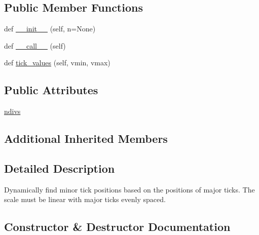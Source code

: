 \subsection*{Public Member Functions}
\begin{DoxyCompactItemize}
\item 
def \hyperlink{classmatplotlib_1_1ticker_1_1AutoMinorLocator_aa4a7d68d7cd0c7fa8e579b0b408b34d3}{\+\_\+\+\_\+init\+\_\+\+\_\+} (self, n=None)
\item 
def \hyperlink{classmatplotlib_1_1ticker_1_1AutoMinorLocator_aada705290a86fa27af2012611312d2c5}{\+\_\+\+\_\+call\+\_\+\+\_\+} (self)
\item 
def \hyperlink{classmatplotlib_1_1ticker_1_1AutoMinorLocator_ac7896a11a578475a94768a2550e8f40b}{tick\+\_\+values} (self, vmin, vmax)
\end{DoxyCompactItemize}
\subsection*{Public Attributes}
\begin{DoxyCompactItemize}
\item 
\hyperlink{classmatplotlib_1_1ticker_1_1AutoMinorLocator_a0e154b92e34e9a618bd671f0eb036c63}{ndivs}
\end{DoxyCompactItemize}
\subsection*{Additional Inherited Members}


\subsection{Detailed Description}
\begin{DoxyVerb}Dynamically find minor tick positions based on the positions of
major ticks. The scale must be linear with major ticks evenly spaced.
\end{DoxyVerb}
 

\subsection{Constructor \& Destructor Documentation}
\mbox{\label{classmatplotlib_1_1ticker_1_1AutoMinorLocator_aa4a7d68d7cd0c7fa8e579b0b408b34d3}} 
